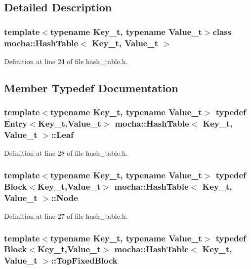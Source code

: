 \subsection{Detailed Description}
\subsubsection*{template$<$typename Key\_\-t, typename Value\_\-t$>$class mocha::HashTable$<$ Key\_\-t, Value\_\-t $>$}



Definition at line 24 of file hash\_\-table.h.



\subsection{Member Typedef Documentation}
\hypertarget{classmocha_1_1_hash_table_a3c863111b21220947a039924bf185b18}{
\subsubsection[{Leaf}]{\setlength{\rightskip}{0pt plus 5cm}template$<$typename Key\_\-t, typename Value\_\-t$>$ typedef {\bf Entry}$<$Key\_\-t,Value\_\-t$>$ {\bf mocha::HashTable}$<$ Key\_\-t, Value\_\-t $>$::{\bf Leaf}}}
\label{classmocha_1_1_hash_table_a3c863111b21220947a039924bf185b18}


Definition at line 28 of file hash\_\-table.h.

\hypertarget{classmocha_1_1_hash_table_a1bcb8a4bec495c629f3df6cd6c25b610}{
\subsubsection[{Node}]{\setlength{\rightskip}{0pt plus 5cm}template$<$typename Key\_\-t, typename Value\_\-t$>$ typedef {\bf Block}$<$Key\_\-t,Value\_\-t$>$ {\bf mocha::HashTable}$<$ Key\_\-t, Value\_\-t $>$::{\bf Node}}}
\label{classmocha_1_1_hash_table_a1bcb8a4bec495c629f3df6cd6c25b610}


Definition at line 27 of file hash\_\-table.h.

\hypertarget{classmocha_1_1_hash_table_a83e016fe56f778ffc27cb24f90304cdf}{
\subsubsection[{TopFixedBlock}]{\setlength{\rightskip}{0pt plus 5cm}template$<$typename Key\_\-t, typename Value\_\-t$>$ typedef {\bf Block}$<$Key\_\-t,Value\_\-t$>$ {\bf mocha::HashTable}$<$ Key\_\-t, Value\_\-t $>$::{\bf TopFixedBlock}}}
\label{classmocha_1_1_hash_table_a83e016fe56f778ffc27cb24f90304cdf}


